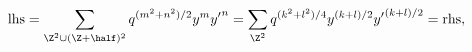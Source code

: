 \begin{equation*}
  {\rm lhs} = \sum_{\Z^2 \cup (\Z+\half)^2} q^{(m^2 +n^2)/2} y^m {y'}^n = \sum_{\Z^2} q^{(k^2 +l^2)/4} y^{(k+l)/2} {y'}^{(k+l)/2} =  {\rm rhs},
\end{equation*}

